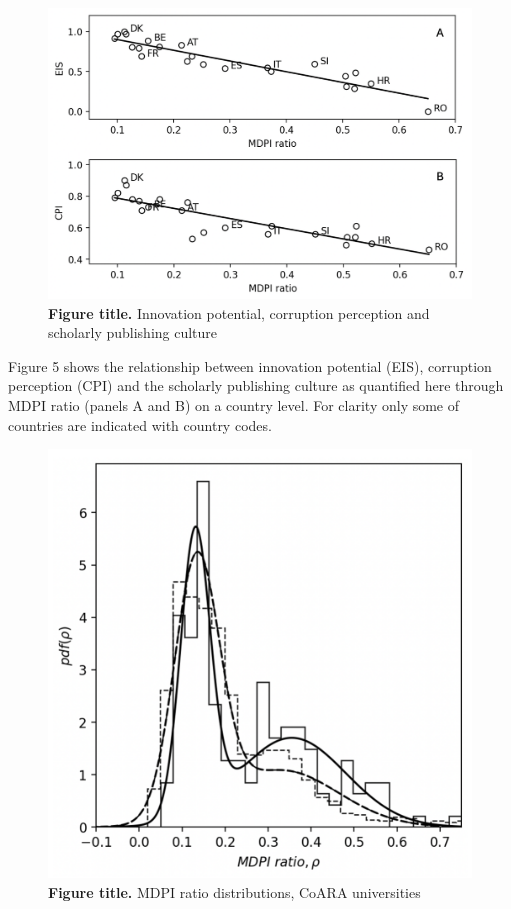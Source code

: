 \documentclass[amsfonts, amssymb, prl, superscriptaddress, notitlepage, twocolumn, nofootinbib]{revtex4-2}
\begin{document}
\begin{figure}
    \centering
    \includegraphics[width=1.0\linewidth]{Fig04.png}
    \caption{\label{fig:fig4} {\bf Figure title.} Innovation potential, corruption perception and scholarly publishing culture  
}
\end{figure}

Figure 5 shows the relationship between innovation potential (EIS), corruption perception (CPI) and the scholarly publishing culture as quantified here through MDPI ratio (panels A and B) on a country level. For clarity only some of countries are indicated with country codes.

\begin{figure}
    \centering
    \includegraphics[width=.6\linewidth]{Fig05.png}
    \caption{\label{fig:fig5} {\bf Figure title.} MDPI ratio distributions, CoARA universities  
}
\end{figure}
\end{document}
